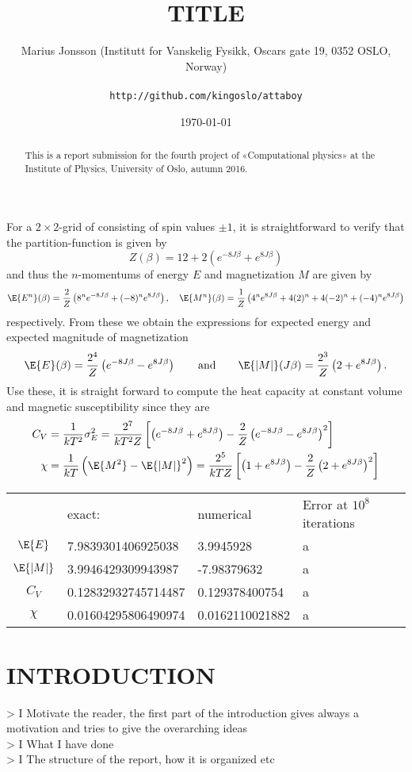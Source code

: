 \documentclass[11pt,english,a4paper]{article}
\author{\normalsize Marius Jonsson (Institutt for Vanskelig Fysikk, Oscars gate 19, 0352 OSLO, Norway) \\\\
\vspace{5px}
\normalsize \texttt{http://github.com/kingoslo/attaboy}}
\title{\bf \uppercase{TiTlE}}
\date{\normalsize \today}
\begin{document}
\maketitle
\begin{abstract} \normalsize This is a report submission for the fourth project of «Computational physics» at the Institute of Physics, University of Oslo, autumn 2016.
\end{abstract}
\lstset{
  xleftmargin=.2\textwidth, xrightmargin=.2\textwidth
}
For a $2 \times 2$-grid of consisting of spin values $\pm 1$, it is straightforward to verify that the partition-function is given by
\[
Z(\beta) = 12 + 2\left( e^{ -8 J\beta} + e^{ 8 J\beta} \right)
\]
and thus the $n$-momentums of energy $E$ and magnetization $M$ are given by
\[
\E{E^n}(\beta) = \frac{2}{Z}\left( 8^n e^{ -8 J\beta} + (-8)^n e^{ 8 J\beta}  \right), \quad \E{M^n}(\beta) = \frac{1}{Z}\left( 4^n e^{ 8 J\beta} + 4(2)^n + 4(-2)^n + (-4)^n e^{ 8 J\beta}  \right)
\]
respectively. From these we obtain the expressions for expected energy and expected magnitude of magnetization 
\[
\E{E}(\beta) = \frac{2^4}{Z}\left( e^{ -8 J\beta} - e^{ 8 J\beta}  \right) \qquad \text{and} \qquad \E{|M|}(J\beta) = \frac{2^3}{Z}\left(  2 + e^{ 8 J\beta} \right).
\]
Use these, it is straight forward to compute the heat capacity at constant volume and magnetic susceptibility since they are
\begin{align*}
C_V &= \frac{1}{kT^2}\sigma_E^2 = \frac{2^7}{kT^2Z}\left[  \left( e^{ -8J\beta} + e^{ 8J\beta} \right) - \frac{2}{Z}\left( e^{ -8J\beta} - e^{ 8J\beta} \right)^2  \right] \\
\chi &= \frac{1}{kT} \left(\E{M^2} -\E{|M|}^2 \right) = \frac{2^5}{kTZ} \left[ \left( 1 + e^{ 8J \beta} \right) - \frac{2}{Z}\left( 2 + e^{ 8J \beta} \right)^2 \right]
\end{align*}
\begin{table}
\begin{tabular}{c l l l}
&exact:					& numerical& Error at $10^8$ iterations\\
$\E{E}$ & 7.9839301406925038		& 3.9945928& a\\
$\E{|M|}$ & 3.9946429309943987		& -7.98379632& a\\
$C_V$ & 0.12832932745714487	& 0.129378400754& a\\
$\chi$ & 0.01604295806490974		& 0.0162110021882& a
\end{tabular}
\end{table}

\section*{\uppercase{Introduction}}
> I Motivate the reader, the first part of the introduction gives always a motivation and tries to give the overarching ideas\\
> I What I have done\\
> I The structure of the report, how it is organized etc
\end{document}
